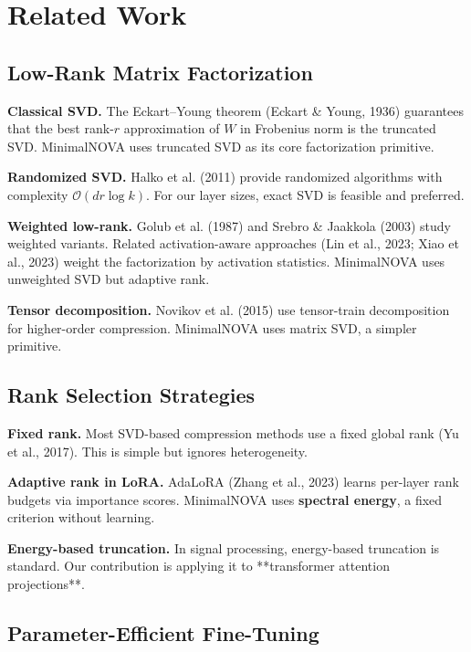 
\section{Related Work}

\subsection{Low-Rank Matrix Factorization}

\textbf{Classical SVD.} The Eckart--Young theorem (Eckart \& Young, 1936) guarantees 
that the best rank-$r$ approximation of $W$ in Frobenius norm is the truncated 
SVD. MinimalNOVA uses truncated SVD as its core factorization primitive.

\textbf{Randomized SVD.} Halko et al. (2011) provide randomized algorithms with 
complexity $\mathcal{O}(dr \log k)$. For our layer sizes, exact SVD is 
feasible and preferred.

\textbf{Weighted low-rank.} Golub et al. (1987) and Srebro \& Jaakkola (2003) study 
weighted variants. Related activation-aware approaches (Lin et al., 2023; 
Xiao et al., 2023) weight the factorization by activation statistics. 
MinimalNOVA uses unweighted SVD but adaptive rank.

\textbf{Tensor decomposition.} Novikov et al. (2015) use tensor-train 
decomposition for higher-order compression. MinimalNOVA uses matrix SVD, a 
simpler primitive.

\subsection{Rank Selection Strategies}

\textbf{Fixed rank.} Most SVD-based compression methods use a fixed global rank 
(Yu et al., 2017). This is simple but ignores heterogeneity.

\textbf{Adaptive rank in LoRA.} AdaLoRA (Zhang et al., 2023) learns per-layer 
rank budgets via importance scores. MinimalNOVA uses \textbf{spectral energy}, 
a fixed criterion without learning.

\textbf{Energy-based truncation.} In signal processing, energy-based truncation 
is standard. Our contribution is applying it to **transformer attention 
projections**.

\subsection{Parameter-Efficient Fine-Tuning}

